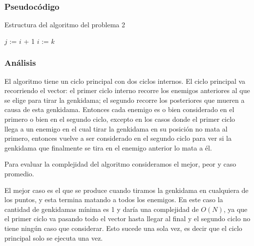\subsubsection{Pseudocódigo}
\begin{algorithm}[h]
\caption{Estructura del algoritmo del problema 2}
\begin{algorithmic}[1]
		$j$ := $i$ + 1
		\EndWhile
		\EndWhile
		$i$ := $k$
	\EndFor
	\EndFor
	\EndFunction
\end{algorithmic}
\end{algorithm}


\subsubsection{Análisis}
El algoritmo tiene un ciclo principal con dos ciclos internos. El ciclo principal va recorriendo el vector: el primer ciclo interno recorre los enemigos anteriores al que se elige para tirar la genkidama; el segundo recorre los posteriores que mueren a causa de esta genkidama. Entonces cada enemigo es o bien considerado en el primero o bien en el segundo ciclo, excepto en los casos donde el primer ciclo llega a un enemigo en el cual tirar la genkidama en su posición no mata al primero, entonces vuelve a ser considerado en el segundo ciclo para ver si la genkidama que finalmente se tira en el enemigo anterior lo mata a él.

Para evaluar la complejidad del algoritmo consideramos el mejor, peor y caso promedio.

El mejor caso es el que se produce cuando tiramos la genkidama en cualquiera de los puntos, y esta termina matando a todos los enemigos. En este caso la cantidad de genkidamas mínima es 1 y daría una complejidad de $O(N)$, ya que el primer ciclo va pasando todo el vector hasta llegar al final y el segundo ciclo no tiene ningún caso que considerar. Esto sucede una sola vez, es decir que el ciclo principal solo se ejecuta una vez.

